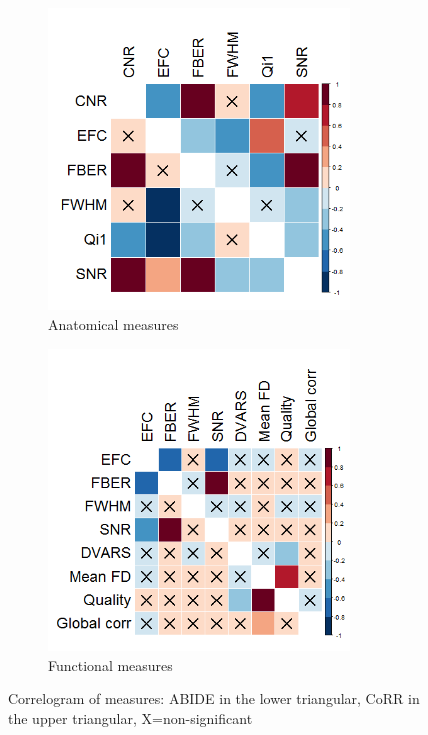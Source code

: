 \documentclass{frontiersSCNS} %
\begin{document}
\begin{figure}[!ht]
  \centering
     \begin{subfigure}[b]{0.4\textwidth}
       \includegraphics[width=8cm]{fig2_bysite_sig_anat_corrplot}
       \caption{Anatomical measures}
     \end{subfigure}
     \begin{subfigure}[b]{0.4\textwidth}
       \includegraphics[width=8cm]{fig2_bysite_sig_func_corrplot}
       \caption{Functional measures}
     \end{subfigure} 
     \caption{Correlogram of measures: ABIDE in the lower triangular, CoRR in the upper triangular, X=non-significant}
\end{figure}
\end{document}
